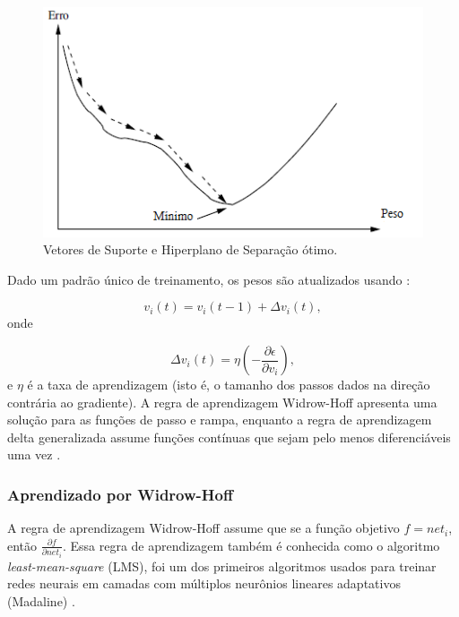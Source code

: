 \begin{figure}[h]
	\centering
	\includegraphics[width=.6\textwidth]{image/gd.png}
	\caption{Vetores de Suporte e Hiperplano de Separação ótimo.}
	\label{fig:gd}
\end{figure}

Dado um padrão único de treinamento, os pesos são atualizados usando \label{symbol:atualizacaopesosGD}:

\begin{equation}
\label{eq:gd1}
v_i(t) = v_i(t-1) + \Delta v_i(t),
\end{equation}
onde

\begin{equation}
\label{eq:gd2}
\Delta v_i(t) = \eta (- \frac{\partial \epsilon}{\partial v_i}),
\end{equation}
e $\eta$ é a taxa de aprendizagem (isto é, o tamanho dos passos dados na direção contrária ao gradiente). A regra de aprendizagem Widrow-Hoff apresenta uma solução para as funções de passo e rampa, enquanto a regra de aprendizagem delta generalizada assume funções contínuas que sejam pelo menos diferenciáveis uma vez \cite{engelbrecht2007computational}.

\subsubsection{Aprendizado por Widrow-Hoff}

A regra de aprendizagem Widrow-Hoff assume que se a função objetivo $f = net_i$, então $\frac{\partial f}{\partial net_i}$. Essa regra de aprendizagem também é conhecida como o algoritmo \textit{least-mean-square} (LMS), foi um dos primeiros algoritmos usados para treinar redes neurais em camadas com múltiplos neurônios lineares adaptativos (Madaline) \cite{engelbrecht2007computational}.

